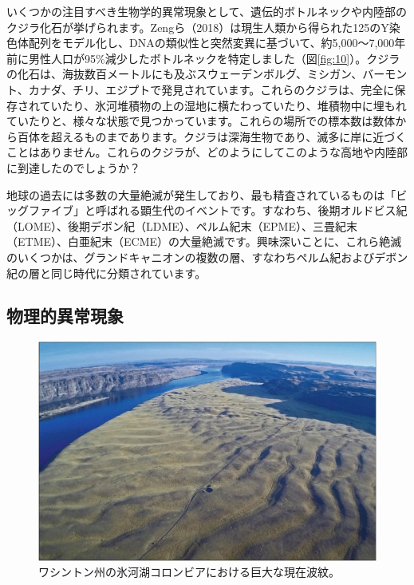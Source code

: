 \documentclass[10pt,twocolumn,letterpaper]{article}
\begin{document}
いくつかの注目すべき生物学的異常現象として、遺伝的ボトルネックや内陸部のクジラ化石が挙げられます。Zengら（2018）は現生人類から得られた125のY染色体配列をモデル化し、DNAの類似性と突然変異に基づいて、約5,000～7,000年前に男性人口が95\%減少したボトルネックを特定しました（図\ref{fig:10}）\cite{62}。クジラの化石は、海抜数百メートルにも及ぶスウェーデンボルグ、ミシガン、バーモント、カナダ、チリ、エジプトで発見されています\cite{63,64,65,66}。これらのクジラは、完全に保存されていたり、氷河堆積物の上の湿地に横たわっていたり、堆積物中に埋もれていたりと、様々な状態で見つかっています。これらの場所での標本数は数体から百体を超えるものまであります。クジラは深海生物であり、滅多に岸に近づくことはありません。これらのクジラが、どのようにしてこのような高地や内陸部に到達したのでしょうか？

地球の過去には多数の大量絶滅が発生しており、最も精査されているものは「ビッグファイブ」と呼ばれる顕生代のイベントです。すなわち、後期オルドビス紀（LOME）、後期デボン紀（LDME）、ペルム紀末（EPME）、三畳紀末（ETME）、白亜紀末（ECME）の大量絶滅です\cite{88,89}。興味深いことに、これら絶滅のいくつかは、グランドキャニオンの複数の層、すなわちペルム紀およびデボン紀の層と同じ時代に分類されています。

\subsection{物理的異常現象}

\begin{figure}[t]
\begin{center}
   \includegraphics[width=1\linewidth]{columbia.jpg}
\end{center}
   \caption{ワシントン州の氷河湖コロンビアにおける巨大な現在波紋\cite{80}。}
\label{fig:11}
\label{fig:onecol}
\end{figure}
\end{document}

